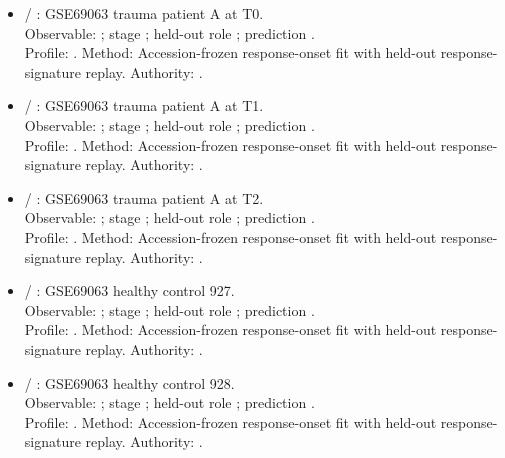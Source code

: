 \begin{itemize}
\item {} / : GSE69063 trauma patient A at T0.\\ Observable: ; stage ; held-out role ; prediction .\\ Profile: . Method: Accession-frozen response-onset fit with held-out response-signature replay. Authority: .
\item {} / : GSE69063 trauma patient A at T1.\\ Observable: ; stage ; held-out role ; prediction .\\ Profile: . Method: Accession-frozen response-onset fit with held-out response-signature replay. Authority: .
\item {} / : GSE69063 trauma patient A at T2.\\ Observable: ; stage ; held-out role ; prediction .\\ Profile: . Method: Accession-frozen response-onset fit with held-out response-signature replay. Authority: .
\item {} / : GSE69063 healthy control 927.\\ Observable: ; stage ; held-out role ; prediction .\\ Profile: . Method: Accession-frozen response-onset fit with held-out response-signature replay. Authority: .
\item {} / : GSE69063 healthy control 928.\\ Observable: ; stage ; held-out role ; prediction .\\ Profile: . Method: Accession-frozen response-onset fit with held-out response-signature replay. Authority: .
\end{itemize}


